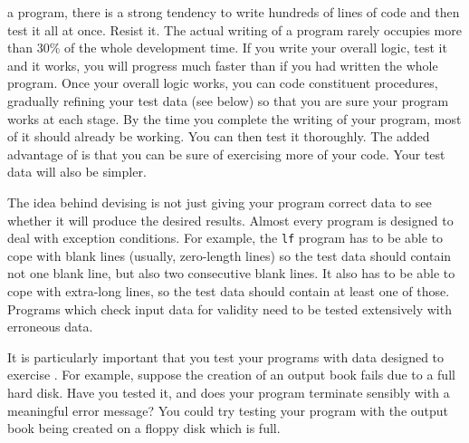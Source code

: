   a program, there
is a strong tendency to write hundreds of lines of code and then test
it all at once.  Resist it.  The actual writing of a program rarely
occupies more than 30\% of the whole development time.  If you write
your overall logic, test it and it works, you will progress much
faster than if you had written the whole program.  Once your overall
logic works, you can code constituent procedures, gradually refining
your test data (see below) so that you are sure your program works at
each stage.  By the time you complete the writing of your program,
most of it should already be working.  You can then test it
thoroughly.  The added advantage of  is that
you can be sure of exercising more of your code.  Your test data will
also be simpler.

The idea behind devising  is not just
giving your program correct data to see whether it will produce the
desired results.  Almost every program is designed to deal with
exception conditions.  For example, the \verb|lf| program has to be
able to cope with blank lines (usually, zero-length lines) so the
test data should contain not one blank line, but also two consecutive
blank lines.  It also has to be able to cope with extra-long lines,
so the test data should contain at least one of those.  Programs
which check input data for validity need to be tested extensively
with erroneous data.

It is particularly important that you test your programs with data
designed to exercise .  For example, suppose
the creation of an output book fails due to a full hard disk. Have
you tested it, and does your program terminate sensibly with a
meaningful error message? You could try testing your program with the
output book being created on a floppy disk which is full.

